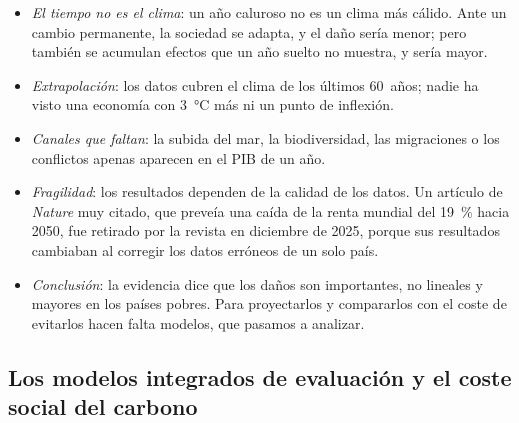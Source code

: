 \documentclass[11pt]{article}
\begin{document}
\begin{itemize}
\item \emph{El tiempo no es el clima}: un año caluroso no es un clima más cálido. Ante un cambio permanente, la sociedad se adapta, y el daño sería menor; pero también se acumulan efectos que un año suelto no muestra, y sería mayor.
\item \emph{Extrapolación}: los datos cubren el clima de los últimos 60~años; nadie ha visto una economía con 3~°C más ni un punto de inflexión.
\item \emph{Canales que faltan}: la subida del mar, la biodiversidad, las migraciones o los conflictos apenas aparecen en el PIB de un año.
\item \emph{Fragilidad}: los resultados dependen de la calidad de los datos. Un artículo de \emph{Nature} muy citado, que preveía una caída de la renta mundial del 19~\% hacia 2050, fue retirado por la revista en diciembre de 2025, porque sus resultados cambiaban al corregir los datos erróneos de un solo país\nocite{Nature2025RetraccionKotz}.
\item \emph{Conclusión}: la evidencia dice que los daños son importantes, no lineales y mayores en los países pobres. Para proyectarlos y compararlos con el coste de evitarlos hacen falta modelos, que pasamos a analizar.
\end{itemize}

\subsection{Los modelos integrados de evaluación y el coste social del carbono}\label{sec:mie}
\end{document}
